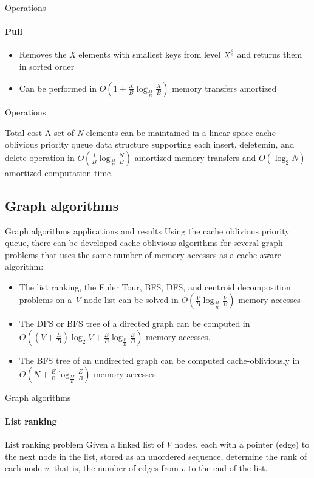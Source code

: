 \documentclass{beamer}
\begin{document}
\begin{darkframes}
    \begin{frame}{Operations}
    \framesubtitle{Pull}
    \begin{itemize}
    \item Removes the \textit{X} elements with smallest keys from level \(X^\frac{3}{2}\) and returns them in sorted order
    \item Can be performed in \(O(1 + \frac{X}{B}\log_\frac{M}{B} \frac{X}{B})\) memory transfers amortized
    \end{itemize}
    \end{frame}

    \begin{frame}{Operations}
    \begin{block}{Total cost}
    A set of \textit{N} elements can be maintained in a linear-space cache-oblivious priority queue data structure supporting each insert, deletemin, and delete operation in \(O(\frac{1}{B}\log_\frac{M}{B} \frac{N}{B})\) amortized memory transfers and \(O(\log_2 N)\) amortized computation time.
    \end{block}
    \end{frame}
    
    \subsection{Graph algorithms}
    \begin{frame}{Graph algorithms applications and results}
    Using the cache oblivious priority queue, there can be developed cache oblivious algorithms for several graph problems that uses the same number of memory accesses as a cache-aware algorithm:
    \begin{itemize}
    \item The list ranking, the Euler Tour, BFS, DFS, and centroid decomposition problems on a \textit{V} node list can be solved in \(O(\frac{V}{B}\log_\frac{M}{B} \frac{V}{B})\) memory accesses
    \item The DFS or BFS tree of a directed graph can be computed in \(O((V + \frac{E}{B})\log_2 V + \frac{E}{B}\log_\frac{E}{B} \frac{E}{B})\) memory accesses.
    \item The BFS tree of an undirected graph can be computed cache-obliviously in \(O(N + \frac{E}{B}\log_\frac{M}{B} \frac{E}{B})\) memory accesses.
    \end{itemize}
    \end{frame}
    
    \begin{frame}{Graph algorithms}
    \framesubtitle{List ranking}
    \begin{block}{List ranking problem}
    	Given a linked list of \(V\) nodes, each with a pointer (edge) to the next node in the list, stored as an unordered sequence, determine the rank of each node \(v\), that is, the number of edges from \(v\) to the end of the list.
    \end{block}
    \end{frame}
    

\end{darkframes}
\end{document}
